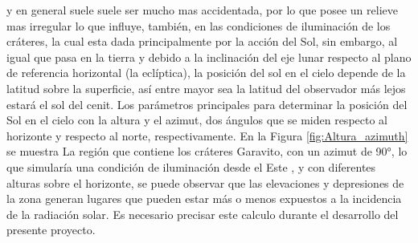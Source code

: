 \documentclass[12pt]{article}
\begin{document}
\parencite{LESLIE2019598} y en general suele suele ser mucho mas accidentada, por lo que posee un relieve 
mas irregular lo que influye, también, en las condiciones de 
iluminación de los cráteres, la cual esta dada principalmente por la acción del Sol, 
sin embargo, al igual que pasa en la tierra y debido a la inclinación del eje lunar respecto 
al plano de referencia horizontal (la eclíptica), la posición del sol en el cielo depende de la 
latitud  sobre la superficie, así entre mayor sea la latitud del 
observador más lejos estará el sol del cenit. Los parámetros principales para determinar  la 
posición del Sol en el cielo con la altura y el azimut, dos ángulos que se miden respecto 
al horizonte y respecto al norte, respectivamente\parencite{kolaczek1968selenocentric}. En la Figura 
\ref{fig:Altura_azimuth} se muestra 
La región que contiene los cráteres Garavito, con un azimut de 90°, lo que simularía una condición de 
iluminación desde el Este , y con diferentes alturas sobre el horizonte, se puede observar que 
las elevaciones y depresiones de la zona generan lugares que pueden estar más o menos 
expuestos a la incidencia de la radiación solar. Es necesario precisar este calculo durante el desarrollo 
del presente proyecto.\\
\end{document}
